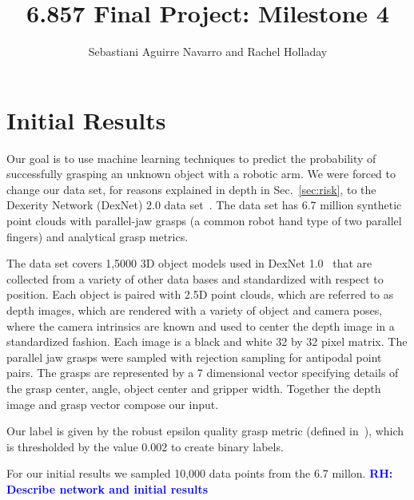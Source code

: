 \documentclass[letterpaper, 10 pt]{article}
\newcommand{\sref}[1]{Sec.~\ref{#1}} %
\newcommand{\rhnote}[1]{\ifthenelse{\boolean{include-notes}}%
 {\textcolor{blue}{\textbf{RH: #1}}}{}}
\begin{document}
\title{6.857 Final Project: Milestone 4}
\author{Sebastiani Aguirre Navarro and Rachel Holladay}
\maketitle

\section{Initial Results}
\label{sec:results}

Our goal is to use machine learning techniques to predict the probability of successfully grasping an unknown object with a robotic arm.
We were forced to change our data set, for reasons explained in depth in \sref{sec:risk}, to the Dexerity Network (DexNet) 2.0 data set~\cite{mahler2017dex}.
The data set has 6.7 million synthetic point clouds with parallel-jaw grasps (a common robot hand type of two parallel fingers) and analytical grasp metrics. 

The data set covers 1,5000 3D object models used in DexNet 1.0~\cite{mahler2016dex} that are collected from a variety of other data bases and standardized with respect to position. 
Each object is paired with 2.5D point clouds, which are referred to as depth images, which are rendered with a variety of object and camera poses, where the camera intrinsics are known and used to center the depth image in a standardized fashion.
Each image is a black and white 32 by 32 pixel matrix. 
The parallel jaw grasps were sampled with rejection sampling for antipodal point pairs. 
The grasps are represented by a 7 dimensional vector specifying details of the grasp center, angle, object center and gripper width. 
Together the depth image and grasp vector compose our input. 

Our label is given by the robust epsilon quality grasp metric (defined in~\cite{seita2016large}), which is thresholded by the value 0.002 to create binary labels.

For our initial results we sampled 10,000 data points from the 6.7 millon. 
\rhnote{Describe network and initial results}
\end{document}
